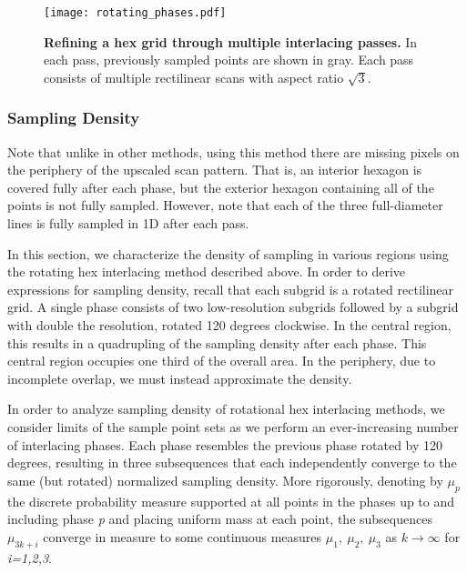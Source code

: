 \documentclass[aip, amsmath, amssymb, nobibnotes, nofootinbib, citeautoscript, reprint, superscriptaddress]{revtex4-2}
\begin{document}
    \begin{figure*}
        
        \texttt{[image: rotating\_phases.pdf]}
        \caption{
            \label{fig:rotatingphases} 
            \textbf{Refining a hex grid through multiple interlacing passes.}
            In each pass, previously sampled points are shown in gray.
            Each pass consists of multiple rectilinear scans with aspect ratio $\sqrt{3}$.
            }
    \end{figure*}

    \subsubsection{\label{sec:density}Sampling Density}

    Note that unlike in other methods, using this method there are missing pixels on the periphery of the upscaled scan pattern.
    That is, an interior hexagon is covered fully after each phase, but the exterior hexagon containing all of the points is not fully sampled.
    However, note that each of the three full-diameter lines is fully sampled in 1D after each pass.


    In this section, we characterize the density of sampling in various regions using the rotating hex interlacing method described above.
    In order to derive expressions for sampling density, recall that each subgrid is a rotated rectilinear grid.
    A single phase consists of two low-resolution subgrids followed by a subgrid with double the resolution, rotated 120 degrees clockwise.
    In the central region, this results in a quadrupling of the sampling density after each phase.
    This central region occupies one third of the overall area.
    In the periphery, due to incomplete overlap, we must instead approximate the density.


    In order to analyze sampling density of rotational hex interlacing methods, we consider limits of the sample point sets as we perform an ever-increasing number of interlacing phases.
    Each phase resembles the previous phase rotated by 120 degrees, resulting in three subsequences that each independently converge to the same (but rotated) normalized sampling density.
    More rigorously, denoting by $\mu_p$ the discrete probability measure supported at all points in the phases up to and including phase \textit{p} and placing uniform mass at each point, the subsequences $\mu_{3k+i}$ converge in measure to some continuous measures $\mu_1,\ \mu_2,\ \mu_3$ as $k\to\infty$ for \textit{i=1,2,3}.
\end{document}
